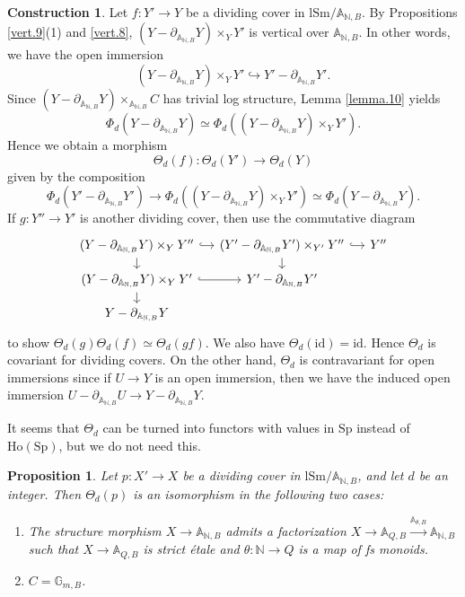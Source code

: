 \documentclass[10pt]{amsart}
\newtheorem{prop}[thm]{Proposition}
\theoremstyle{definition}
\newtheorem{const}[thm]{Construction}
\theoremstyle{remark}
\numberwithin{equation}{subsection}
\newcommand{\A}{\mathbb{A}}
\newcommand{\G}{\mathbb{G}}
\newcommand{\N}{\mathbb{N}}
\newcommand{\id}{\mathrm{id}}
\newcommand{\Spt}{\mathrm{Sp}}
\newcommand{\Ho}{\mathrm{Ho}}
\newcommand{\lSm}{\mathrm{lSm}}
\begin{document}
\begin{const}
Let $f\colon Y'\to Y$ be a dividing cover in $\lSm/\A_{\N,B}$.
By Propositions \ref{vert.9}(1) and \ref{vert.8}, $(Y-\partial_{\A_{\N,B}}Y)\times_Y Y'$ is vertical over $\A_{\N,B}$.
In other words, we have the open immersion
\begin{equation}
\label{lemma.11.1}
(Y-\partial_{\A_{\N,B}}Y)\times_Y Y'
\hookrightarrow
Y'-\partial_{\A_{\N,B}} Y'.
\end{equation}
Since $(Y-\partial_{\A_{\N,B}} Y)\times_{\A_{\N,B}} C$ has trivial log structure,
Lemma \ref{lemma.10} yields
\[
\Phi_d(Y-\partial_{\A_{\N,B}}Y)
\simeq
\Phi_d((Y-\partial_{\A_{\N,B}}Y)\times_Y Y').
\]
Hence we obtain a morphism
\begin{equation}
\label{lemma.11.2}
\Theta_d(f)\colon \Theta_d(Y')\to \Theta_d(Y)
\end{equation}
given by the composition
\[
\Phi_d(Y'-\partial_{\A_{\N,B}}Y')
\to 
\Phi_d((Y-\partial_{\A_{\N,B}}Y)\times_Y Y')
\simeq 
\Phi_d(Y-\partial_{\A_{\N,B}}Y).
\]
If $g\colon Y''\to Y'$ is another dividing cover, then use the commutative diagram
\[
\begin{tikzcd}[column sep=small, row sep=small]
(Y-\partial_{\A_{\N,B}}Y)\times_Y Y''\ar[r,hookrightarrow]\ar[d]&
(Y'-\partial_{\A_{\N,B}} Y')\times_{Y'}Y''\ar[r,hookrightarrow]\ar[d]&
Y''
\\
(Y-\partial_{\A_{\N,B}}Y)\times_Y Y'\ar[r,hookrightarrow]\ar[d]&
Y'-\partial_{\A_{\N,B}} Y'
\\
Y-\partial_{\A_{\N,B}}Y
\end{tikzcd}
\]
to show $\Theta_d(g)\Theta_d(f)\simeq \Theta_d(gf)$.
We also have $\Theta_d(\id)=\id$.
Hence $\Theta_d$ is covariant for dividing covers.
On the other hand, $\Theta_d$ is contravariant for open immersions since if $U\to Y$ is an open immersion, then we have the induced open immersion $U-\partial_{\A_{\N,B}}U\to Y-\partial_{\A_{\N,B}}Y$.

It seems that $\Theta_d$ can be turned into functors with values in $\Spt$ instead of $\Ho(\Spt)$, but we do not need this.
\end{const}

\begin{prop}
\label{lemma.7}
Let $p\colon X'\to X$ be a dividing cover in $\lSm/\A_{\N,B}$, and let $d$ be an integer.
Then $\Theta_d(p)$ is an isomorphism in the following two cases:
\begin{enumerate}
\item[\textup{(i)}]
The structure morphism $X\to \A_{\N,B}$ admits a factorization $X\to \A_{Q,B}\xrightarrow{\A_{\theta,B}}\A_{\N,B}$ such that $X\to \A_{Q,B}$ is strict \'etale and $\theta\colon \N\to Q$ is a map of fs monoids.
\item[\textup{(ii)}]
$C=\G_{m,B}$.
\end{enumerate}
\end{prop}
\end{document}
